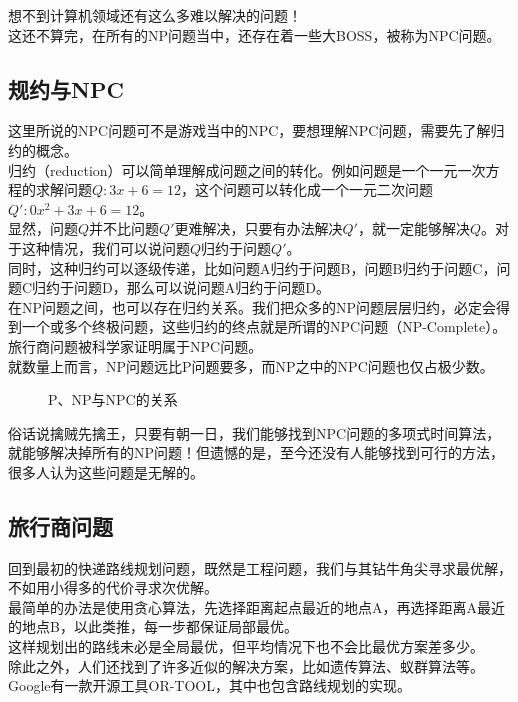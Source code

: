 想不到计算机领域还有这么多难以解决的问题！\\

这还不算完，在所有的NP问题当中，还存在着一些大BOSS，被称为NPC问题。\\

\subsection{规约与NPC}

这里所说的NPC问题可不是游戏当中的NPC，要想理解NPC问题，需要先了解归约的概念。\\

归约（reduction）可以简单理解成问题之间的转化。例如问题是一个一元一次方程的求解问题$ Q: 3x + 6 = 12 $，这个问题可以转化成一个一元二次问题$ Q': 0x^2 + 3x + 6 = 12 $。\\

显然，问题$ Q $并不比问题$ Q' $更难解决，只要有办法解决$ Q' $，就一定能够解决$ Q $。对于这种情况，我们可以说问题$ Q $归约于问题$ Q' $。\\

同时，这种归约可以逐级传递，比如问题A归约于问题B，问题B归约于问题C，问题C归约于问题D，那么可以说问题A归约于问题D。\\

在NP问题之间，也可以存在归约关系。我们把众多的NP问题层层归约，必定会得到一个或多个终极问题，这些归约的终点就是所谓的NPC问题（NP-Complete）。旅行商问题被科学家证明属于NPC问题。\\

就数量上而言，NP问题远比P问题要多，而NP之中的NPC问题也仅占极少数。

\begin{figure}[H]
	\centering
	\caption{P、NP与NPC的关系}
\end{figure}

俗话说擒贼先擒王，只要有朝一日，我们能够找到NPC问题的多项式时间算法，就能够解决掉所有的NP问题！但遗憾的是，至今还没有人能够找到可行的方法，很多人认为这些问题是无解的。\\

\subsection{旅行商问题}

回到最初的快递路线规划问题，既然是工程问题，我们与其钻牛角尖寻求最优解，不如用小得多的代价寻求次优解。\\

最简单的办法是使用贪心算法，先选择距离起点最近的地点A，再选择距离A最近的地点B，以此类推，每一步都保证局部最优。\\

这样规划出的路线未必是全局最优，但平均情况下也不会比最优方案差多少。\\

除此之外，人们还找到了许多近似的解决方案，比如遗传算法、蚁群算法等。Google有一款开源工具OR-TOOL，其中也包含路线规划的实现。

\newpage